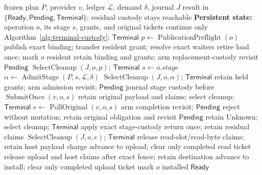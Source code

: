 \begin{algorithm}[!htbp]
\caption{Progress one exact materialization operation}
\label{alg:normal-materialization}
\fontsize{9}{9.6}\selectfont
\begin{algorithmic}[1]
\REQUIRE frozen plan $P$, provider $v$, ledger $\mathcal L$, demand $\delta$, journal $J$
\ENSURE result in $\{\mathsf{Ready},\mathsf{Pending},\mathsf{Terminal}\}$; residual custody stays reachable
\STATE \textbf{Persistent state:} operation $o$, its stage $s$, grants, and original tickets
  \STATE continue only Algorithm~\ref{alg:terminal-custody}; \algorithmicreturn{} $\mathsf{Terminal}$
\ENDIF
{}
    \STATE $p\gets\operatorname{PublicationPreflight}(o)$
      \STATE publish exact binding; transfer resident grant; resolve exact waiters
      \STATE retire load once; mark $o$ resident
      \STATE retain binding and grants; arm replacement-custody revisit
      \RETURN $\mathsf{Pending}$
    \ELSE
      \STATE $\operatorname{SelectCleanup}(J,o,p)$; \algorithmicreturn{} $\mathsf{Terminal}$
    \ENDIF
  \ELSE
    \STATE $s\gets o.\mathit{stage}$
      \STATE $\alpha\gets\operatorname{AdmitStage}(P,s,\mathcal L,\delta)$
        \STATE $\operatorname{SelectCleanup}(J,o,\alpha)$; \algorithmicreturn{} $\mathsf{Terminal}$
        \STATE retain held grants; arm admission revisit; \algorithmicreturn{} $\mathsf{Pending}$
      \ENDIF
      \STATE journal stage custody before $\operatorname{SubmitOnce}(v,o,s)$
        \STATE retain original payload and claims; select cleanup; \algorithmicreturn{} $\mathsf{Terminal}$
      \ENDIF
    \ENDIF
    \STATE $e\gets\operatorname{PollOriginal}(v,o,s)$
      \STATE arm completion revisit; \algorithmicreturn{} $\mathsf{Pending}$
      \STATE reject without mutation; retain original obligation and revisit
      \RETURN $\mathsf{Pending}$
      \STATE retain Unknown; select cleanup; \algorithmicreturn{} $\mathsf{Terminal}$
    \ENDIF
    \STATE apply exact stage-custody return once; retain residual claims
      \STATE $\operatorname{SelectCleanup}(J,o,e)$; \algorithmicreturn{} $\mathsf{Terminal}$
      \STATE release read-slot/read-byte claims; retain host payload charge
      \STATE advance to upload; clear only completed read ticket
      \STATE release upload and host claims after exact fence; retain destination
      \STATE advance to install; clear only completed upload ticket
    \ELSE
      \STATE mark $o$ installed
    \ENDIF
  \ENDIF
\ENDWHILE
\RETURN $\mathsf{Ready}$
\end{algorithmic}
\end{algorithm}

